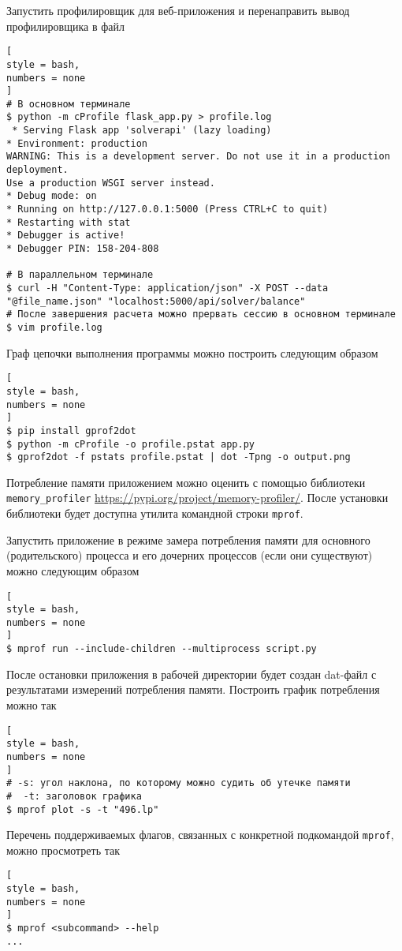 \documentclass[%
	11pt,
	a4paper,
	utf8,
		]{article}
\begin{document}
Запустить профилировщик для веб-приложения и перенаправить вывод профилировщика в файл
\begin{lstlisting}[
style = bash,
numbers = none
]
# В основном терминале
$ python -m cProfile flask_app.py > profile.log
 * Serving Flask app 'solverapi' (lazy loading)
* Environment: production
WARNING: This is a development server. Do not use it in a production deployment.
Use a production WSGI server instead.
* Debug mode: on
* Running on http://127.0.0.1:5000 (Press CTRL+C to quit)
* Restarting with stat
* Debugger is active!
* Debugger PIN: 158-204-808

# В параллельном терминале
$ curl -H "Content-Type: application/json" -X POST --data "@file_name.json" "localhost:5000/api/solver/balance"
# После завершения расчета можно прервать сессию в основном терминале
$ vim profile.log
\end{lstlisting}

Граф цепочки выполнения программы можно построить следующим образом
\begin{lstlisting}[
style = bash,
numbers = none
]
$ pip install gprof2dot
$ python -m cProfile -o profile.pstat app.py
$ gprof2dot -f pstats profile.pstat | dot -Tpng -o output.png
\end{lstlisting}

Потребление памяти приложением можно оценить с помощью библиотеки \texttt{memory\_profiler} \url{https://pypi.org/project/memory-profiler/}. После установки библиотеки будет доступна утилита командной строки \texttt{mprof}.

Запустить приложение в режиме замера потребления памяти для основного (родительского) процесса и его дочерних процессов (если они существуют) можно следующим образом
\begin{lstlisting}[
style = bash,
numbers = none
]
$ mprof run --include-children --multiprocess script.py
\end{lstlisting}

После остановки приложения в рабочей директории будет создан dat-файл с результатами измерений потребления памяти. Построить график потребления можно так
\begin{lstlisting}[
style = bash,
numbers = none
]
# -s: угол наклона, по которому можно судить об утечке памяти
#  -t: заголовок графика
$ mprof plot -s -t "496.lp"
\end{lstlisting}

Перечень поддерживаемых флагов, связанных с конкретной подкомандой \texttt{mprof}, можно просмотреть так
\begin{lstlisting}[
style = bash,
numbers = none
]
$ mprof <subcommand> --help
...
\end{lstlisting}
\end{document}
